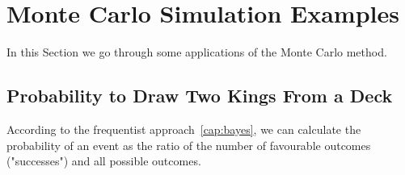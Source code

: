 %
%
%

\section{Monte Carlo Simulation Examples}
\label{example-of-monte-carlo-simulation}

In this Section we go through some applications of the Monte Carlo method.

\subsection{Probability to Draw Two Kings From a Deck}
According to the frequentist approach~\ref{cap:bayes}, we can calculate the probability of an event as the ratio of the number of favourable outcomes ("successes") and all possible outcomes. 

